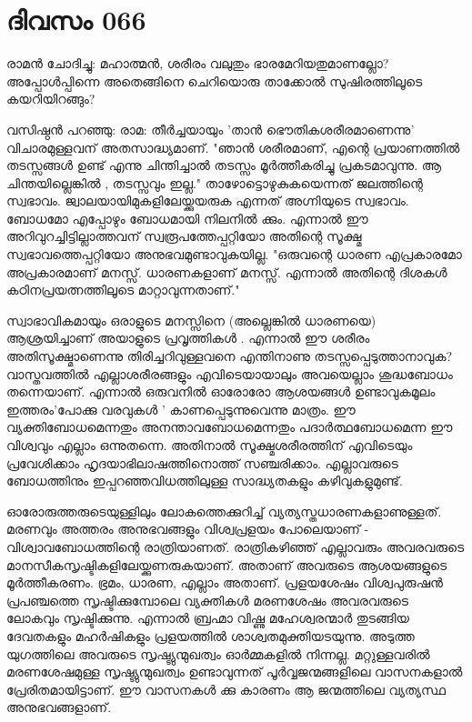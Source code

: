 \newpage
\section{ദിവസം 066}


രാമന്‍ ചോദിച്ചു: മഹാത്മന്‍, ശരീരം വലുതും ഭാരമേറിയതുമാണല്ലോ? അപ്പോള്‍പ്പിന്നെ അതെങ്ങിനെ ചെറിയൊരു താക്കോൽ സുഷിരത്തിലൂടെ കയറിയിറങ്ങും?

വസിഷ്ഠന്‍ പറഞ്ഞു: രാമ: തീര്‍ച്ചയായും 'താന്‍ ഭൌതികശരീരമാണെന്നു' വിചാരമുള്ളവന്‌ അതസാദ്ധ്യമാണ്‌. "ഞാന്‍ ശരീരമാണ്‌, എന്റെ പ്രയാണത്തില്‍ തടസ്സങ്ങള്‍ ഉണ്ട്‌ എന്നു ചിന്തിച്ചാല്‍ തടസ്സം മൂര്‍ത്തീകരിച്ചു പ്രകടമാവുന്നു. ആ ചിന്തയില്ലെങ്കില്‍ , തടസ്സവും ഇല്ല." താഴോട്ടൊഴുകുകയെന്നത്‌ ജലത്തിന്റെ സ്വഭാവം. ജ്വാലയായിമുകളിലേയ്ക്കുയരുക എന്നത്‌ അഗ്നിയുടെ സ്വഭാവം. ബോധമോ എപ്പോഴും ബോധമായി നിലനില്‍ ക്കും. എന്നാല്‍ ഈ അറിവുറച്ചിട്ടില്ലാത്തവന്‌ സ്വരൂപത്തേപ്പറ്റിയോ അതിന്റെ സൂക്ഷ്മ സ്വഭാവത്തെപ്പറ്റിയോ അനുഭവമുണ്ടാവുകയില്ല. "ഒരുവന്റെ ധാരണ എപ്രകാരമോ അപ്രകാരമാണ്‌ മനസ്സ്‌. ധാരണകളാണ്‌ മനസ്സ്‌. എന്നാല്‍ അതിന്റെ ദിശകള്‍ കഠിനപ്രയത്നത്തിലൂടെ മാറ്റാവുന്നതാണ്‌."

സ്വാഭാവികമായും ഒരാളുടെ മനസ്സിനെ (അല്ലെങ്കില്‍ ധാരണയെ) ആശ്രയിച്ചാണ്‌ അയാളുടെ പ്രവൃത്തികള്‍ . എന്നാല്‍ ഈ ശരീരം അതിസൂക്ഷ്മാണെന്നു തിരിച്ചറിവുള്ളവനെ എന്തിനാണു തടസ്സപ്പെടുത്താനാവുക? വാസ്തവത്തില്‍ എല്ലാശരീരങ്ങളും എവിടെയായാലും അവയെല്ലാം ശുദ്ധബോധം തന്നെയാണ്‌. എന്നാല്‍ ഒരുവനില്‍ ഓരോരോ ആശയങ്ങള്‍ ഉണ്ടാവുകമൂലം ഇത്തരം'പോക്കു വരവുകള്‍ ' കാണപ്പെടുന്നുവെന്നു മാത്രം. ഈ വ്യക്തിബോധമെന്നതും അനന്താവബോധമെന്നതും പദാര്‍ത്ഥബോധമെന്ന ഈ വിശ്വവും എല്ലാം ഒന്നുതന്നെ. അതിനാല്‍ സൂക്ഷ്മശരീരത്തിന്‌ എവിടെയും പ്രവേശിക്കാം ഹൃദയാഭിലാഷത്തിനൊത്ത്‌ സഞ്ചരിക്കാം. എല്ലാവരുടെ ബോധത്തിനും ഇപ്പറഞ്ഞവിധത്തിലുള്ള സാദ്ധ്യതകളും കഴിവുകളുമുണ്ട്‌. 

ഓരോരുത്തരുടെയുള്ളിലും ലോകത്തെക്കുറിച്ച്‌ വ്യത്യസ്തധാരണകളാണുള്ളത്‌. മരണവും അത്തരം അനുഭവങ്ങളും വിശ്വപ്രളയം പോലെയാണ്‌ - വിശ്വാവബോധത്തിന്റെ രാത്രിയാണത്‌. രാത്രികഴിഞ്ഞ്‌ എല്ലാവരും അവരവരുടെ മാനസീകസൃഷ്ടികളിലേയ്ക്കുണരുകയാണ്‌. അതാണ്‌ അവരുടെ ആശയങ്ങളുടെ മൂര്‍ത്തീകരണം. ഭ്രമം, ധാരണ, എല്ലാം അതാണ്‌. പ്രളയശേഷം വിശ്വപുരുഷന്‍ പ്രപഞ്ചത്തെ സൃഷ്ടിക്കുമ്പോലെ വ്യക്തികള്‍ മരണശേഷം അവരവരുടെ ലോകവും സൃഷ്ടിക്കുന്നു. എന്നാല്‍ ബ്രഹ്മാ വിഷ്ണു മഹേശ്വരന്മാര്‍ തുടങ്ങിയ ദേവതകളും മഹര്‍ഷികളും പ്രളയത്തില്‍ ശാശ്വതമുക്തിയടയുന്നു. അടുത്ത യുഗത്തിലെ അവരുടെ സൃഷ്ട്യുന്മുഖത്വം ഓര്‍മ്മകളില്‍ നിന്നല്ല. മറ്റുള്ളവരില്‍ മരണശേഷമുള്ള സൃഷ്ട്യുന്മുഖത്വം ഉണ്ടാവുന്നത്‌ പൂര്‍വ്വജന്മങ്ങളിലെ വാസനകളാല്‍ പ്രേരിതമായിട്ടാണ്‌. ഈ വാസനകള്‍ ക്കു കാരണം ആ ജന്മത്തിലെ വ്യത്യസ്ഥ അനുഭവങ്ങളാണ്‌.

